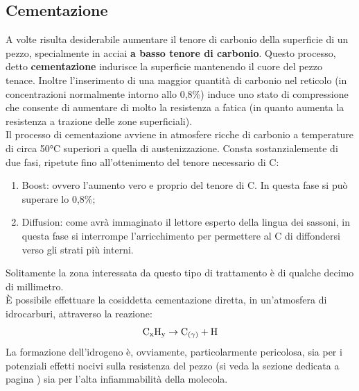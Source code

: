 \subsection{Cementazione}
A volte risulta desiderabile aumentare il tenore di carbonio della superficie di un pezzo, specialmente in acciai \textbf{a basso tenore di carbonio}. Questo processo, detto \textbf{cementazione} indurisce la superficie mantenendo il cuore del pezzo tenace. Inoltre l'inserimento di una maggior quantità di carbonio nel reticolo (in concentrazioni normalmente intorno allo 0,8\%) induce uno stato di compressione che consente di aumentare di molto la resistenza a fatica (in quanto aumenta la resistenza a trazione delle zone superficiali). \\
Il processo di cementazione avviene in atmosfere ricche di carbonio a temperature di circa 50°C superiori a quella di austenizzazione. Consta sostanzialemente di due fasi, ripetute fino all'ottenimento del tenore necessario di C:
\begin{enumerate}
    \item Boost: ovvero l'aumento vero e proprio del tenore di C. In questa fase si può superare lo 0,8\%;
    \item Diffusion: come avrà immaginato il lettore esperto della lingua dei sassoni, in questa fase si interrompe l'arricchimento per permettere al C di diffondersi verso gli strati più interni.
\end{enumerate}
Solitamente la zona interessata da questo tipo di trattamento è di qualche decimo di millimetro.\\
È possibile effettuare la cosiddetta cementazione diretta, in un'atmosfera di idrocarburi, attraverso la reazione:
\begin{equation*}
    \mbox{$\mathrm{C_xH_y \to C_{(\gamma)}+ H}$}
\end{equation*}
La formazione dell'idrogeno è, ovviamente, particolarmente pericolosa, sia per i potenziali effetti nocivi sulla resistenza del pezzo (si veda la sezione dedicata a pagina \pageref{problema idrogeno}) sia per l'alta infiammabilità della molecola.

